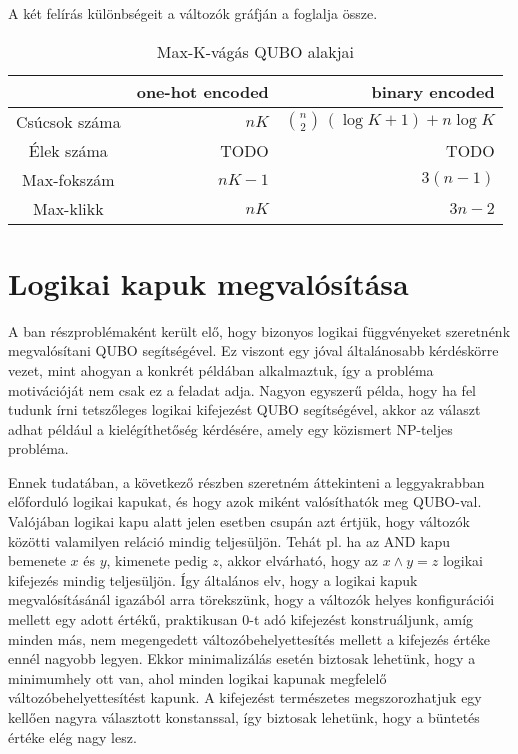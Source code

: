 A két felírás különbségeit a változók gráfján a  foglalja össze.


\begin{table}[ht]
	\footnotesize
	\centering
	\begin{tabular}{ c r r }
		\toprule
		  & one-hot encoded & binary encoded \\
		\midrule
		Csúcsok száma  & $n K$     & $\binom{n}{2} \, ( \log K + 1 ) + n \log K$ \\
		Élek száma & TODO & TODO \\
		Max-fokszám    & $n K - 1 $ & $3(n-1)$ \\
		Max-klikk      & $n K$     & $3n-2$ \\		
		\bottomrule
	\end{tabular}
	\caption{Max-K-vágás QUBO alakjai}
	\label{tab:diffMaxKCutFormulas}
\end{table}

  

\section{Logikai kapuk megvalósítása}\label{sec:theoryLogicalGates}

A ban részproblémaként került elő, hogy bizonyos logikai függvényeket szeretnénk megvalósítani QUBO segítségével. Ez viszont egy jóval általánosabb kérdéskörre vezet, mint ahogyan a konkrét példában alkalmaztuk, így a probléma motivációját nem csak ez a feladat adja. Nagyon egyszerű példa, hogy ha fel tudunk írni tetszőleges logikai kifejezést QUBO segítségével, akkor az választ adhat például a kielégíthetőség kérdésére, amely egy közismert NP-teljes probléma\cite{algoritmusokBook}.

Ennek tudatában, a következő részben szeretném áttekinteni a leggyakrabban előforduló logikai kapukat, és hogy azok miként valósíthatók meg QUBO-val. Valójában logikai kapu alatt jelen esetben csupán azt értjük, hogy változók közötti valamilyen reláció mindig teljesüljön. Tehát pl. ha az AND kapu bemenete $x$ és $y$, kimenete pedig $z$, akkor elvárható, hogy az $x \wedge y = z$ logikai kifejezés mindig teljesüljön. Így általános elv, hogy a logikai kapuk megvalósításánál igazából arra törekszünk, hogy a változók helyes konfigurációi mellett egy adott értékű, praktikusan 0-t adó kifejezést konstruáljunk, amíg minden más, nem megengedett változóbehelyettesítés mellett a kifejezés értéke ennél nagyobb legyen. Ekkor minimalizálás esetén biztosak lehetünk, hogy a minimumhely ott van, ahol minden logikai kapunak megfelelő változóbehelyettesítést kapunk. A kifejezést természetes megszorozhatjuk egy kellően nagyra választott konstanssal, így biztosak lehetünk, hogy a büntetés értéke elég nagy lesz.

